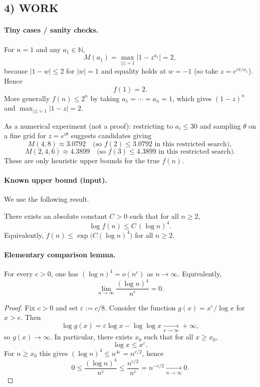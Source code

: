\subsection*{4) WORK}
\paragraph{Tiny cases / sanity checks.}
For $n=1$ and any $a_1\in\mathbb{N}$,
\[
M(a_1)=\max_{\left\lvert z\right\rvert=1}\left\lvert 1-z^{a_1}\right\rvert=2,
\]
because $\left\lvert 1-w\right\rvert\le 2$ for $\left\lvert w\right\rvert=1$ and equality holds at $w=-1$ (so take $z=e^{i\pi/a_1}$). Hence
\[
f(1)=2.
\]
More generally $f(n)\le 2^n$ by taking $a_1=\cdots=a_n=1$, which gives $(1-z)^n$ and $\max_{\left\lvert z\right\rvert=1}\left\lvert 1-z\right\rvert=2$.

As a numerical experiment (not a proof): restricting to $a_i\le 30$ and sampling $\theta$ on a fine grid for $z=e^{i\theta}$ suggests candidates giving
\[
M(4,8)\approx 3.0792\quad\text{(so }f(2)\le 3.0792\text{ in this restricted search)},
\]
\[
M(2,4,6)\approx 4.3899\quad\text{(so }f(3)\le 4.3899\text{ in this restricted search)}.
\]
These are only heuristic upper bounds for the true $f(n)$.

\paragraph{Known upper bound (input).}
We use the following result.
\begin{theorem}
There exists an absolute constant $C>0$ such that for all $n\ge 2$,
\[
\log f(n)\le C\,(\log n)^4.
\]
Equivalently, $f(n)\le \exp\bigl(C(\log n)^4\bigr)$ for all $n\ge 2$.
\end{theorem}

\paragraph{Elementary comparison lemma.}
\begin{lemma}\label{lem:log4_vs_power}
For every $c>0$, one has $(\log n)^4 = o(n^c)$ as $n\to\infty$. Equivalently,
\[\lim_{n\to\infty}\frac{(\log n)^4}{n^c}=0.\]
\end{lemma}
\begin{proof}
Fix $c>0$ and set $\varepsilon:=c/8$. Consider the function $g(x)=x^{\varepsilon}/\log x$ for $x>e$.
Then
\[
\log g(x)=\varepsilon\log x-\log\log x\xrightarrow[x\to\infty]{}+\infty,
\]
so $g(x)\to\infty$. In particular, there exists $x_0$ such that for all $x\ge x_0$,
\[\log x \le x^{\varepsilon}.
\]
For $n\ge x_0$ this gives $(\log n)^4 \le n^{4\varepsilon}=n^{c/2}$, hence
\[
0\le \frac{(\log n)^4}{n^c}\le \frac{n^{c/2}}{n^c}=n^{-c/2}\xrightarrow[n\to\infty]{}0.
\]
\end{proof}

